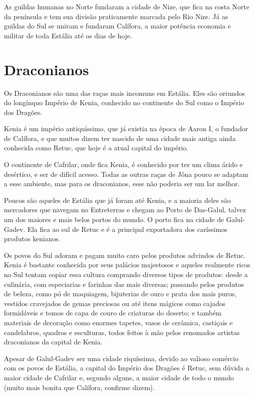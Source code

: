 \documentclass{RPG_Adventure}[2021/10/20]
\begin{document}
As guildas humanas no Norte fundaram a cidade de Nize, que fica na costa Norte
da península e tem sua divisão praticamente marcada pelo Rio Nize. Já as guildas
do Sul se uniram e fundaram Calífora, a maior potência economia e militar de
toda Estália até os dias de hoje.

\section*{Draconianos}%

Os Draconianos são uma das raças mais incomuns em Estália. Eles são oriundos do
longínquo Império de Kenia, conhecido no continente do Sul como o Império dos
Dragões.

Kenia é um império antiquíssimo, que já existia na época de Aaron I, o fundador
de Calífora, e que muitos dizem ter nascido de uma cidade mais antiga ainda
conhecida como Retuc, que hoje é a atual capital do império.

O continente de Cafrilar, onde fica Kenia, é conhecido por ter um clima árido e
desértico, e ser de difícil acesso. Todas as outras raças de Jǒna pouco se
adaptam a esse ambiente, mas para os draconianos, esse não poderia ser um lar
melhor.

Poucos são aqueles de Estália que já foram até Kenia, e a maioria deles são
mercadores que navegam no Entreterras e chegam ao Porto de Das-Galul, talvez um
dos maiores e mais belos portos do mundo. O porto fica na cidade de Galul-Gadev.
Ela fica ao sul de Retuc e é a principal exportadora dos caríssimos produtos
kenianos.

Os povos do Sul adoram e pagam muito caro pelos produtos advindos de Retuc.
Kenia é bastante conhecida por seus palácios majestosos e aqueles realmente
ricos no Sul tentam copiar essa cultura comprando diversos tipos de produtos:
desde a culinária, com especiarias e farinhas das mais diversas; passando pelos
produtos de beleza, como pó de maquiagem, bijuterias de ouro e prata dos mais
puros, vestidos cravejados de gemas preciosas ou até itens mágicos como cajados
formidáveis e tomos de capa de couro de criaturas do deserto; e também materiais
de decoração como enormes tapetes, vasos de cerâmica, castiçais e candelabros,
quadros e esculturas, todos feitos à mão pelos renomados artistas draconianos da
capital de Kenia.

Apesar de Galul-Gadev ser uma cidade riquíssima, devido ao valioso comércio com
os povos de Estália, a capital do Império dos Dragões é Retuc, sem dúvida a
maior cidade de Cafrilar e, segundo alguns, a maior cidade de todo o mundo
(muito mais bonita que Calífora, confirme dizem).
\end{document}
